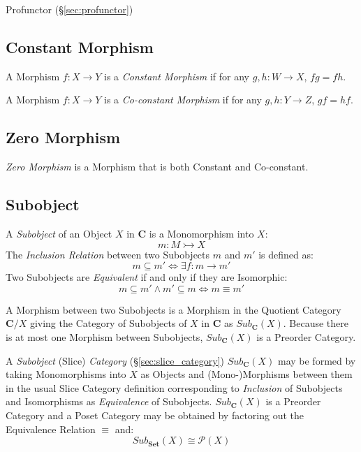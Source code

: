 Profunctor (\S\ref{sec:profunctor})



\subsection{Constant Morphism}\label{sec:constant_morphism}

A Morphism $f : X \rightarrow Y$ is a \emph{Constant Morphism} if for
any $g, h : W \rightarrow X$, $fg = fh$.

A Morphism $f : X \rightarrow Y$ is a \emph{Co-constant Morphism} if
for any $g, h : Y \rightarrow Z$, $gf = hf$.



\subsection{Zero Morphism}\label{sec:zero_morphism}

\emph{Zero Morphism} is a Morphism that is both Constant and
Co-constant.



\subsection{Subobject}\label{sec:subobject}

A \emph{Subobject} of an Object $X$ in $\mathbf{C}$ is a Monomorphism
into $X$:
\[
  m : M \rightarrowtail X
\]
The \emph{Inclusion Relation} between two Subobjects $m$ and $m'$ is
defined as:
\[
  m \subseteq m' \Leftrightarrow \exists f : m \rightarrow m'
\]
Two Subobjects are \emph{Equivalent} if and only if they are
Isomorphic:
\[
  m \subseteq m' \wedge m' \subseteq m \Leftrightarrow m \equiv m'
\]

A Morphism between two Subobjects is a Morphism in the Quotient
Category $\mathbf{C}/X$ giving the Category of Subobjects of $X$ in
$\mathbf{C}$ as $Sub_{\mathbf{C}}(X)$. Because there is at most one
Morphism between Subobjects, $Sub_{\mathbf{C}}(X)$ is a Preorder
Category.

A \emph{Subobject} (Slice) \emph{Category}
(\S\ref{sec:slice_category}) $Sub_\mathbf{C}(X)$ may be formed by
taking Monomorphisms into $X$ as Objects and (Mono-)Morphisms between
them in the usual Slice Category definition corresponding to
\emph{Inclusion} of Subobjects and Isomorphisms as \emph{Equivalence}
of Subobjects. $Sub_\mathbf{C}(X)$ is a Preorder Category and a Poset
Category may be obtained by factoring out the Equivalence Relation
$\equiv$ and:
\[
  Sub_\mathbf{Set}(X) \cong \mathcal{P}(X)
\]

